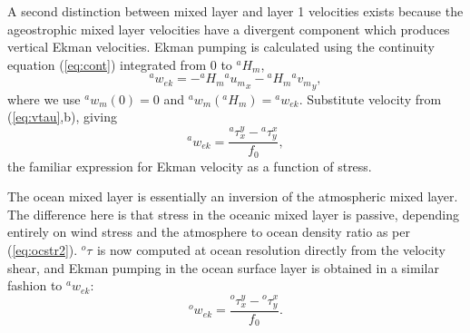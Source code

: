 \documentclass[11pt, a4paper,twoside]{article}
\newcommand{\uu}[2]{{{}^{#1}u_{#2}}}
\newcommand{\vv}[2]{{{}^{#1}v_{#2}}}
\newcommand{\ww}[2]{{{}^{#1}w_{#2}}}
\newcommand{\ek}[1]{{{}^{#1}w_{ek}}}
\newcommand{\HH}[2]{{{}^{#1}H_{#2}}}
\newcommand{\tx}[2]{{}^{#1}\tau^{#2}}
\numberwithin{equation}{section}
\begin{document}
A second distinction between mixed layer and layer 1 velocities exists because the ageostrophic mixed layer velocities have a divergent component which produces vertical Ekman velocities.
Ekman pumping is calculated using the continuity equation (\ref{eq:cont}) integrated from $0$ to $\HH{a}{m}$,
\begin{equation}\label{eq:wek1}
 \ek{a} = - \HH{a}{m} \uu{a}{m}_x - \HH{a}{m} \vv{a}{m}_y,
\end{equation}
where we use $\ww{a}{m}(0)=0$ and $\ww{a}{m}(\HH{a}{m}) = \ek{a}$.
Substitute velocity from (\ref{eq:vtau},b), giving
\begin{equation}\label{eq:atek}
\ek{a}  = \frac{\tx{a}{y}_x - \tx{a}{x}_y}{f_0},
\end{equation}
the familiar expression for Ekman velocity as a function of stress.

The ocean mixed layer is essentially an inversion of the atmospheric mixed layer.
The difference here is that stress in the oceanic mixed layer is passive,  depending entirely on wind stress and the atmosphere to ocean density ratio as per (\ref{eq:ocstr2}).
$\tx{o}{}$ is now computed at ocean resolution directly from the velocity shear,
and Ekman pumping in the ocean surface layer is obtained in a similar fashion to $\ek{a}$:
\begin{equation}\label{eq:ocek}
\ek{o}  = \frac{\tx{o}{y}_x - \tx{o}{x}_y}{f_0}.
\end{equation}
\end{document}
